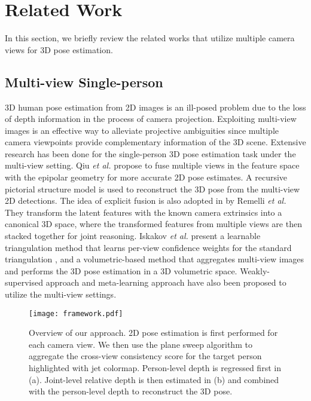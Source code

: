 \documentclass[final]{cvpr}
\begin{document}
\section{Related Work}

In this section, we briefly review the related works that utilize multiple camera views for 3D pose estimation.


\subsection{Multi-view Single-person}
3D human pose estimation from 2D images is an ill-posed problem due to the loss of depth information in the process of camera projection.
Exploiting multi-view images is an effective way to alleviate projective ambiguities since multiple camera viewpoints provide complementary information of the 3D scene.
Extensive research has been done for the single-person 3D pose estimation task under the multi-view setting.
Qiu \textit{et al.} \cite{qiu2019cross} propose to fuse multiple views in the feature space with the epipolar geometry \cite{hartley2003multiple} for more accurate 2D pose estimates. A recursive pictorial structure model is used to reconstruct the 3D pose from the multi-view 2D detections.
The idea of explicit fusion is also adopted in \cite{remelli2020lightweight} by Remelli \textit{et al.} They transform the latent features with the known camera extrinsics into a canonical 3D space, where the transformed features from multiple views are then stacked together for joint reasoning.
Iskakov \textit{et al.} \cite{iskakov2019learnable} present a learnable triangulation method that learns per-view confidence weights for the standard triangulation \cite{hartley2003multiple}, and a volumetric-based method that aggregates multi-view images and performs the 3D pose estimation in a 3D volumetric space.
Weakly-supervised approach \cite{iqbal2020weakly} and meta-learning approach \cite{xie2020metafuse} have also been proposed to utilize the multi-view settings.

\begin{figure*}[t]
    \centering
    \texttt{[image: framework.pdf]}
\caption{Overview of our approach. 2D pose estimation is first performed for each camera view. We then use the plane sweep algorithm to aggregate the cross-view consistency score for the target person highlighted with jet colormap. Person-level depth is regressed first in (a). Joint-level relative depth is then estimated in (b) and combined with the person-level depth to reconstruct the 3D pose.}
\label{fig:framework}
\end{figure*}
\end{document}
